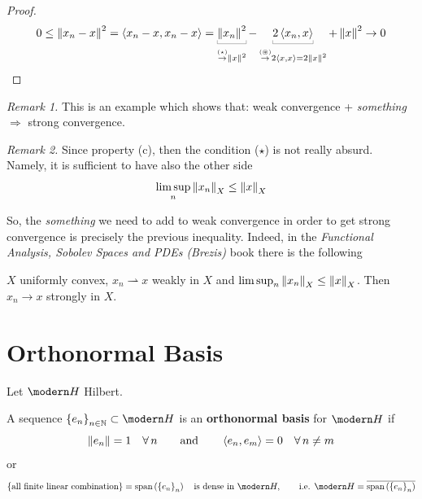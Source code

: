 \begin{proof}\leavevmode
\begin{equation*}
0\leq\norm{x_n-x}^2=\sca{x_n-x,x_n-x}=\underbracket[0.2pt]{\norm{x_n}^2}_{\overset{\underset{(\star)}{}}{\to}\norm{x}^2}-\underbracket[0.2pt]{2\sca{x_n,x}}_{\overset{\underset{(\circledast)}{}}{\to}2\sca{x,x}=2\norm{x}^2}+\norm{x}^2\to 0
\end{equation*}
\end{proof}

\emph{Remark 1.} This is an example which shows that: weak convergence + \emph{something} $\Rightarrow$ strong convergence.

\emph{Remark 2.} Since property (c), then the condition ($\star$) is not really absurd. Namely, it is sufficient to have also the other side
\begin{equation*}
    \limsup_n \left\lVert x_n \right\rVert_X\leq \left\lVert x \right\rVert_X
\end{equation*}

So, the \emph{something} we need to add to weak convergence in order to get strong convergence is precisely the previous inequality. Indeed, in the \emph{Functional Analysis, Sobolev Spaces and PDEs (Brezis)} book there is the following
\begin{proposition}
$X$ uniformly convex, $x_n\rightharpoonup x$ weakly in $X$ and $\limsup_n \left\lVert x_n \right\rVert_X\leq \left\lVert x \right\rVert_X$. Then $x_n\to x$ strongly in $X$.
\end{proposition}


\newpage

\section{Orthonormal Basis} %
\label{sec:orthonormal_basis}

Let $\Hc$ Hilbert.

\begin{defn}
A sequence $\left\{ e_n \right\}_{n\in\NN}\subset\Hc$ is an \textbf{orthonormal basis} for $\Hc$ if
\begin{equation*}
    \norm{e_n}=1\quad\forall n\qquad\text{and}\qquad \sca{e_n,e_m}=0\quad\forall n\neq m
\end{equation*}
or
\begin{equation*}
\left\{ \text{all finite linear combination} \right\}=\text{span}\left( \left\{ e_n \right\}_n \right)\quad\text{is dense in }\Hc, \qquad\text{i.e. }\Hc=\overline{\text{span}\left( \left\{ e_n \right\}_n \right)}
\end{equation*}

\end{defn}

